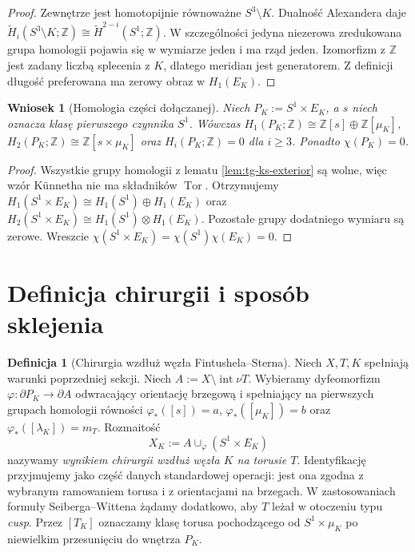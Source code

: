 \documentclass[11pt,a4paper]{report}
\numberwithin{equation}{section}
\theoremstyle{plain}
\newtheorem{wniosek}[twierdzenie]{Wniosek}
\theoremstyle{definition}
\newtheorem{definicja}[twierdzenie]{Definicja}
\theoremstyle{remark}
\begin{document}
\begin{proof}
Zewnętrze jest homotopijnie równoważne $S^3\setminus K$.
Dualność Alexandera daje
$\widetilde H_i(S^3\setminus K;\mathbb Z)
\cong\widetilde H^{2-i}(S^1;\mathbb Z)$.
W szczególności jedyna niezerowa zredukowana grupa
homologii pojawia się w wymiarze jeden i ma rząd jeden.
Izomorfizm z $\mathbb Z$ jest zadany liczbą splecenia
z $K$, dlatego meridian jest generatorem. Z definicji
długość preferowana ma zerowy obraz w $H_1(E_K)$.
\end{proof}

\begin{wniosek}[Homologia części dołączanej]
\label{cor:tg-ks-piece}
Niech $P_K:=S^1\times E_K$, a $s$ niech oznacza
klasę pierwszego czynnika $S^1$. Wówczas
$H_1(P_K;\mathbb Z)\cong\mathbb Z[s]\oplus\mathbb Z[\mu_K]$,
$H_2(P_K;\mathbb Z)\cong\mathbb Z[s\times\mu_K]$
oraz $H_i(P_K;\mathbb Z)=0$ dla $i\ge3$.
Ponadto $\chi(P_K)=0$.
\end{wniosek}

\begin{proof}
Wszystkie grupy homologii z lematu
\ref{lem:tg-ks-exterior} są wolne, więc wzór Künnetha
nie ma składników $\operatorname{Tor}$. Otrzymujemy
$H_1(S^1\times E_K)\cong H_1(S^1)\oplus H_1(E_K)$
oraz $H_2(S^1\times E_K)\cong H_1(S^1)\otimes H_1(E_K)$.
Pozostałe grupy dodatniego wymiaru są zerowe.
Wreszcie $\chi(S^1\times E_K)=\chi(S^1)\chi(E_K)=0$.
\end{proof}

\section{Definicja chirurgii i sposób sklejenia}
\label{sec:tg-ks-glue}

\begin{definicja}[Chirurgia wzdłuż węzła Fintushela--Sterna]
\label{def:tg-ks-operation}
Niech $X,T,K$ spełniają warunki poprzedniej sekcji.
Niech $A:=X\setminus\operatorname{int}\nu T$.
Wybieramy dyfeomorfizm $\varphi:\partial P_K\to\partial A$
odwracający orientację brzegową i spełniający na
pierwszych grupach homologii równości
$\varphi_*([s])=a$, $\varphi_*([\mu_K])=b$
oraz $\varphi_*([\lambda_K])=m_T$.
Rozmaitość
\[
X_K:=A\cup_\varphi(S^1\times E_K)
\]
nazywamy \emph{wynikiem chirurgii wzdłuż węzła $K$ na torusie $T$}.
Identyfikację przyjmujemy jako część danych standardowej
operacji: jest ona zgodna z wybranym ramowaniem torusa
i z orientacjami na brzegach. W zastosowaniach
formuły Seiberga--Wittena żądamy dodatkowo, aby $T$
leżał w otoczeniu typu \emph{cusp}. Przez $[T_K]$
oznaczamy klasę torusa pochodzącego od
$S^1\times\mu_K$ po niewielkim przesunięciu do wnętrza $P_K$.
\end{definicja}
\end{document}
